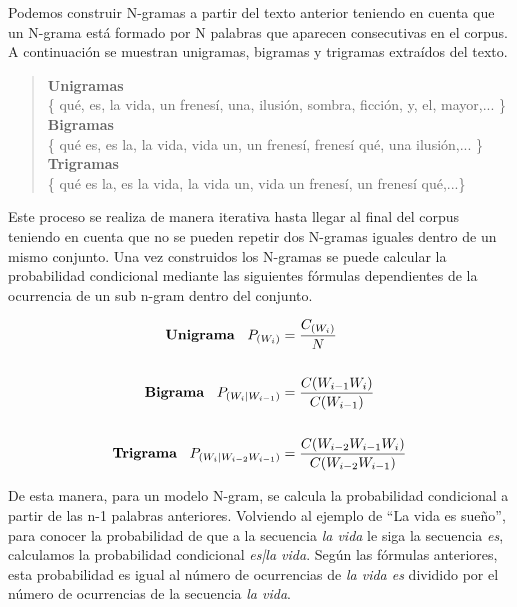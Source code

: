 Podemos construir N-gramas a partir del texto anterior teniendo en cuenta que un N-grama está formado por N palabras que aparecen consecutivas en el corpus. A continuación se muestran unigramas, bigramas y trigramas extraídos del texto.

\begin{verse}
	\textbf{Unigramas} \\
	\{ qué, es, la vida, un frenesí, una, ilusión, sombra, ficción, y, el, mayor,... \}\\
	\textbf{Bigramas} \\
	\{ qué es, es la, la vida, vida un, un frenesí, frenesí qué, una ilusión,... \}\\
	\textbf{Trigramas} \\
	\{ qué es la, es la vida, la vida un, vida un frenesí, un frenesí qué,...\}
\end{verse}


Este proceso se realiza de manera iterativa hasta llegar al final del corpus teniendo en cuenta que no se pueden repetir dos N-gramas iguales dentro de un mismo conjunto. Una vez construidos los N-gramas se puede calcular la probabilidad condicional mediante las siguientes fórmulas dependientes de la ocurrencia de un sub n-gram dentro del conjunto.

\begin{equation}
	\label{eq:probabilidadesngram}
	\begin{aligned}
		\textrm{\textbf{Unigrama}}\:\:\:\:
		P_{(W_i)} & = \frac{C_{(W_i)}}{N}   \\     
		\\
		\textrm{\textbf{Bigrama}}\:\:\:\:
		P_{(W_i|W_{i-1})} & = \frac{C(W_{i-1}W_i)}{C({W_{i-1}})}\\
		\\
		\textrm{\textbf{Trigrama}}\:\:\:\:
		P_{(W_i|W_{i-2}W_{i-1})} & = \frac{C(W_{i-2}W_{i-1}W_i)}{C({W_{i-2}W_{i-1}})}
	\end{aligned}
\end{equation}

De esta manera, para un modelo N-gram, se calcula la probabilidad condicional a partir de las n-1 palabras anteriores. Volviendo al ejemplo de ``La vida es sueño'', para conocer la probabilidad de que a la secuencia \textit{la vida} le siga la secuencia \textit{es}, calculamos la probabilidad condicional \textit{es|la vida}. Según las fórmulas anteriores, esta probabilidad es igual al número de ocurrencias de \textit{la vida es} dividido por el número de ocurrencias de la secuencia \textit{la vida}.

